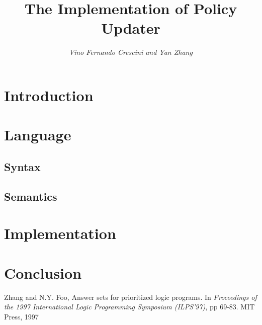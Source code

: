 \documentclass{llncs}
\begin{document}
  \long{}

  \title{The Implementation of Policy Updater}

  \author{\em Vino Fernando Crescini and Yan Zhang}


  \maketitle

  \begin{abstract}

  \end{abstract}

  \section{Introduction}

  \section{Language}

    \subsection{Syntax}

    \subsection{Semantics}

  \section{Implementation}

  \section{Conclusion}

  \begin{thebibliography}{5}

      Zhang and N.Y. Foo,
      Answer sets for prioritized logic programs.
      In {\em Proceedings of the 1997 International Logic Programming
      Symposium (ILPS'97)},
      pp 69-83. 
      MIT Press, 1997

  \end{thebibliography}
\end{document}
